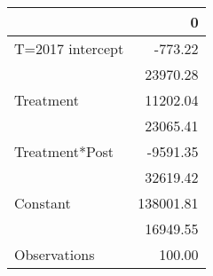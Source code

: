 \begin{tabular}{lr}
\toprule
{} &          0 \\
\midrule
T=2017 intercept &    -773.22 \\
                 &   23970.28 \\
Treatment        &   11202.04 \\
                 &   23065.41 \\
Treatment*Post   &   -9591.35 \\
                 &   32619.42 \\
Constant         &  138001.81 \\
                 &   16949.55 \\
Observations     &     100.00 \\
\bottomrule
\end{tabular}

